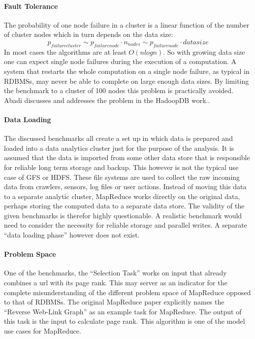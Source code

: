 \documentclass[12pt,a4paper]{scrartcl}		%
\begin{document}
\paragraph{Fault Tolerance}
The probability of one node failure in a cluster is a linear function of the number of cluster nodes which in turn depends on the data size:
\begin{equation*}
  p_{failure cluster} \sim p_{failure node} \cdot n_{nodes} \sim p_{failure node} \cdot datasize
\end{equation*}
In most cases the algorithms are at least $O(n log n)$. So with growing data size one can expect single node failures during the execution of a computation. A system that restarts the whole computation on a single node failure, as typical in RDBMSs, may never be able to complete on large enough data sizes.
By limiting the benchmark to a cluster of 100 nodes this problem is practically avoided. Abadi discusses and addresses the problem in the HadoopDB work.\cite{journals/pvldb/AbouzeidBARS09}.

\paragraph{Data Loading}
The discussed benchmarks all create a set up in which data is prepared and loaded into a data analytics cluster just for the purpose of the analysis. It is assumed that the data is imported from some other data store that is responsible for reliable long term storage and backup.
This however is not the typical use case of GFS or HDFS. These file systems are used to collect the raw incoming data from crawlers, sensors, log files or user actions. Instead of moving this data to a separate analytic cluster, MapReduce works directly on the original data, perhaps storing the computed data to a separate data store.
The validity of the given benchmarks is therefor highly questionable. A realistic benchmark would need to consider the necessity for reliable storage and parallel writes. A separate ``data loading phase'' however does not exist.

\paragraph{Problem Space}
One of the benchmarks, the ``Selection Task'' works on input that already combines a url with its page rank. This may server as an indicator for the complete misunderstanding of the different problem space of MapReduce opposed to that of RDBMSs. The original MapReduce paper explicitly names the ``Reverse Web-Link Graph'' as an example task for MapReduce. The output of this task is the input to calculate page rank. This algorithm is one of the model use cases for MapReduce.
\end{document}
